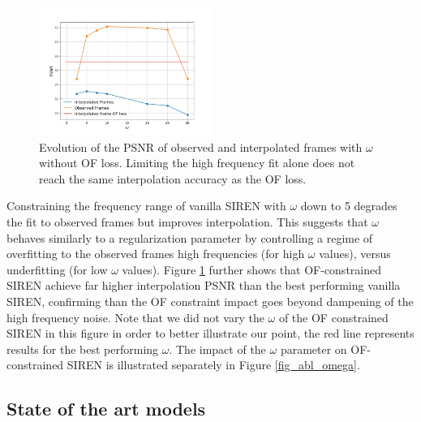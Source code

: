 \documentclass{article}
\begin{document}
\begin{figure}[h]
\centering
\includegraphics[width=0.5\textwidth]{"omega_wo_of"}
\caption{Evolution of the PSNR of observed and interpolated frames with $\omega$ without OF loss.
Limiting the high frequency fit alone does not reach the same interpolation accuracy as the OF loss.}
\label{fig_omega}
\end{figure}

Constraining the frequency range of vanilla SIREN with $\omega$ down to 5 degrades the fit to observed frames but improves interpolation.
This suggests that $\omega$ behaves similarly to a regularization parameter by
controlling a regime of overfitting to the observed frames high frequencies (for high $\omega$ values),
versus underfitting (for low $\omega$ values).
Figure \ref{fig_omega} further shows that OF-constrained SIREN achieve far higher interpolation PSNR than
the best performing vanilla SIREN, confirming than the OF constraint impact goes beyond dampening of the high frequency noise.
Note that we did not vary the $\omega$ of the OF constrained SIREN in this figure in order to better illustrate our point,
the red line represents results for the best performing $\omega$.
The impact of the $\omega$ parameter on OF-constrained SIREN is illustrated separately in Figure \ref{fig_abl_omega}.

\subsection{State of the art models}
\label{sec_sota}
\end{document}
